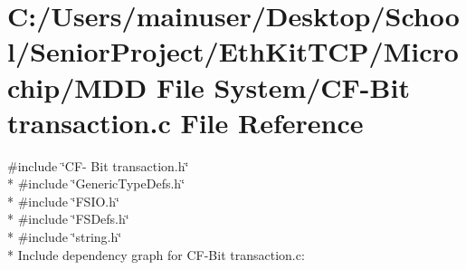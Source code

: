 \hypertarget{_c_f-_bit_01transaction_8c}{}\section{C\+:/\+Users/mainuser/\+Desktop/\+School/\+Senior\+Project/\+Eth\+Kit\+T\+C\+P/\+Microchip/\+M\+D\+D File System/\+C\+F-\/\+Bit transaction.\+c File Reference}
\label{_c_f-_bit_01transaction_8c}
{\ttfamily \#include \char`\"{}C\+F-\/ Bit transaction.\+h\char`\"{}}\\*
{\ttfamily \#include \char`\"{}Generic\+Type\+Defs.\+h\char`\"{}}\\*
{\ttfamily \#include \char`\"{}F\+S\+I\+O.\+h\char`\"{}}\\*
{\ttfamily \#include \char`\"{}F\+S\+Defs.\+h\char`\"{}}\\*
{\ttfamily \#include \char`\"{}string.\+h\char`\"{}}\\*
Include dependency graph for C\+F-\/\+Bit transaction.\+c\+:
